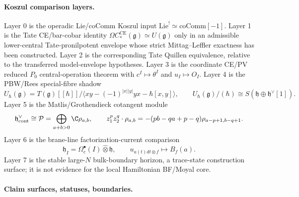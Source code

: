\paragraph{Koszul comparison layers.}
Layer 0 is the operadic Lie/coComm Koszul input
\(\mathrm{Lie}^{!}\simeq\mathrm{coComm}[-1]\).  Layer 1 is the
Tate CE/bar-cobar identity
\(\Omega C^{\mathrm{CE}}_*(\mathfrak g)\simeq U(\mathfrak g)\) only in an
admissible lower-central Tate-pronilpotent envelope whose strict
Mittag--Leffler exactness has been constructed.  Layer 2 is the
corresponding Tate Quillen equivalence, relative to the transferred
model-envelope hypotheses.  Layer 3 is the coordinate CE/PV reduced \(P_0\)
central-operation theorem with \(c^I\mapsto\theta^I\) and
\(u_I\mapsto O_I\).  Layer 4 is the PBW/Rees special-fibre shadow
\[
  U_\hbar(\mathfrak g)
  =
  T(\mathfrak g)[[\hbar]]/
  \langle xy-(-1)^{|x||y|}yx-\hbar[x,y]\rangle,\qquad
  U_\hbar(\mathfrak g)/(\hbar)\cong
  S(\mathfrak h\oplus\mathfrak h^\vee[1]).
\]
Layer 5 is the Matlis/Grothendieck cotangent module
\[
  \mathfrak h^\vee_{\mathrm{cont}}\cong
  \mathcal P=\bigoplus_{a+b>0}\C\rho_{a,b},\qquad
  z_1^pz_2^q\cdot\rho_{a,b}
  =-(pb-qa+p-q)\rho_{a-p+1,b-q+1}.
\]
Layer 6 is the brane-line factorization-current comparison
\[
  \mathfrak h_I=\Omega^\bullet_c(I)\widehat\otimes\mathfrak h,\qquad
  u_{a(t)dt\otimes f}\longmapsto B_f(a).
\]
Layer 7 is the stable large-\(N\) bulk-boundary horizon, a trace-state
construction surface; it is not evidence for the local Hamiltonian
BF/Moyal core.

\medskip
\paragraph{Claim surfaces, statuses, boundaries.}

